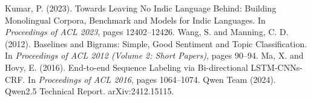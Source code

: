 \documentclass{nle}
\begin{document}
\begin{thebibliography}{}
Kumar, P. (2023). Towards Leaving No Indic Language Behind: Building Monolingual Corpora, Benchmark and Models for Indic
Languages. In \emph{Proceedings of ACL 2023}, pages 12402--12426.
 Wang, S. and Manning, C. D. (2012). Baselines and Bigrams: Simple, Good Sentiment and Topic
Classification. In \emph{Proceedings of ACL 2012 (Volume 2: Short Papers)}, pages 90--94.
 Ma, X. and Hovy, E. (2016). End-to-end Sequence Labeling via Bi-directional LSTM-CNNs-CRF. In
\emph{Proceedings of ACL 2016}, pages 1064--1074.
\enlargethispage{2\baselineskip}
 Qwen Team (2024). Qwen2.5 Technical Report. arXiv:2412.15115.
\end{thebibliography}

\label{lastpage}
\end{document}
